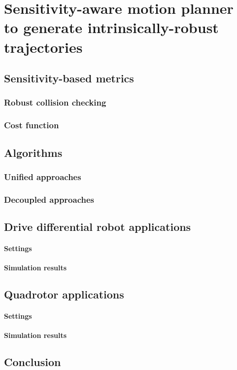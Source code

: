 \chapter{Sensitivity-aware motion planner to generate intrinsically-robust trajectories}

\section{Sensitivity-based metrics}

\subsection{Robust collision checking}
\subsection{Cost function}

\section{Algorithms}
\subsection{Unified approaches}
\subsection{Decoupled approaches}

\section{Drive differential robot applications}
\subsubsection{Settings}
\subsubsection{Simulation results}

\section{Quadrotor applications}
\subsubsection{Settings}
\subsubsection{Simulation results}

\section{Conclusion}

\todomarker{}